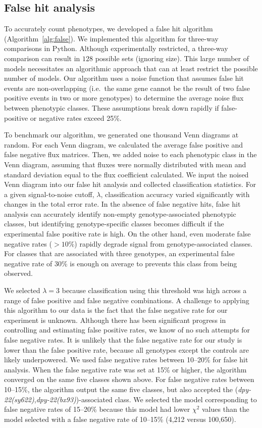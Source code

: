 \documentclass[9pt,twocolumn,twoside]{gsajnl}
\newcommand{\gene}[1]{\mbox{\emph{#1}}}
\newcommand{\dpy}[1]{\gene{dpy-22#1}}
\newcommand{\bx}{\dpy{(bx93)}}
\newcommand{\sy}{\dpy{(sy622)}}
\begin{document}
\subsection*{False hit analysis}
To accurately count phenotypes, we developed a false hit algorithm
(Algorithm~\ref{alg:false}). We implemented this algorithm for three-way
comparisons in Python. Although experimentally restricted, a three-way
comparison can result in $128$ possible sets (ignoring size). This large number
of models necessitates an algorithmic approach that can at least restrict the
possible number of models. Our algorithm uses a noise function that assumes
false hit events are non-overlapping (i.e.\ the same gene cannot be the result
of two false positive events in two or more genotypes) to determine the average
noise flux between phenotypic classes. These assumptions break down rapidly if
false-positive or negative rates exceed 25\%.

To benchmark our algorithm, we generated one thousand Venn diagrams at random.
For each Venn diagram, we calculated the average false positive and false
negative flux matrices. Then, we added noise to each phenotypic class in the
Venn diagram, assuming that fluxes were normally distributed with mean and
standard deviation equal to the flux coefficient calculated. We input the noised
Venn diagram into our false hit analysis and collected classification
statistics. For a given signal-to-noise cutoff, $\lambda$, classification
accuracy varied significantly with changes in the total error rate. In the
absence of false negative hits, false hit analysis can accurately identify
non-empty genotype-associated phenotypic classes, but identifying
genotype-specific classes becomes difficult if the experimental false positive
rate is high. On the other hand, even moderate false negative rates ($>10\%$)
rapidly degrade signal from genotype-associated classes. For classes that are
associated with three genotypes, an experimental false negative rate of 30\% is
enough on average to prevents this class from being observed.

We selected $\lambda=3$ because classification using this threshold was high
across a range of false positive and false negative combinations. A challenge to
applying this algorithm to our data is the fact that the false negative rate for
our experiment is unknown. Although there has been significant progress in
controlling and estimating false positive rates, we know of no such attempts for
false negative rates. It is unlikely that the false negative rate for our study
is lower than the false positive rate, because all genotypes except the controls
are likely underpowered. We used false negative rates between 10--20\% for false
hit analysis. When the false negative rate was set at 15\% or higher, the
algorithm converged on the same five classes shown above. For false negative
rates between 10--15\%, the algorithm output the same five classes, but also
accepted the (\sy{},\bx{})-associated class. We selected the model corresponding
to false negative rates of 15--20\% because this model had lower $\chi^2$ values
than the model selected with a false negative rate of 10--15\% (4,212 versus
100,650).
\end{document}
